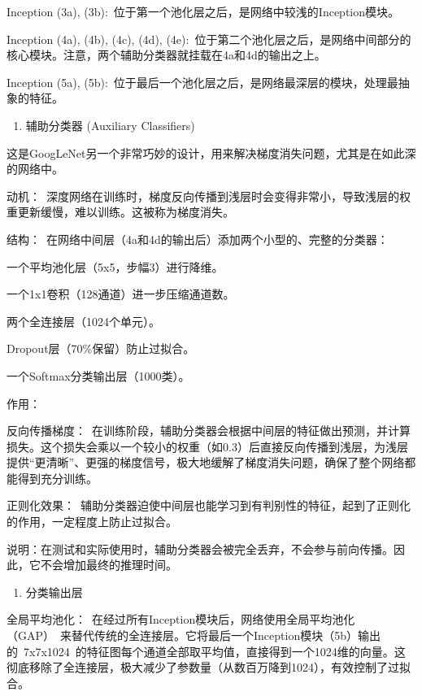 Inception (3a), (3b):~位于第一个池化层之后，是网络中较浅的Inception模块。

Inception (4a), (4b), (4c), (4d), (4e):~位于第二个池化层之后，是网络中间部分的核心模块。注意，两个辅助分类器就挂载在4a和4d的输出之上。

Inception (5a), (5b):~位于最后一个池化层之后，是网络最深层的模块，处理最抽象的特征。

\begin{enumerate}
\def\labelenumi{\arabic{enumi}.}
\setcounter{enumi}{2}
\tightlist
\item
  辅助分类器 (Auxiliary Classifiers)
\end{enumerate}

这是GoogLeNet另一个非常巧妙的设计，用来解决梯度消失问题，尤其是在如此深的网络中。

动机：~深度网络在训练时，梯度反向传播到浅层时会变得非常小，导致浅层的权重更新缓慢，难以训练。这被称为梯度消失。

结构：~在网络中间层（4a和4d的输出后）添加两个小型的、完整的分类器：

一个平均池化层（5x5，步幅3）进行降维。

一个1x1卷积（128通道）进一步压缩通道数。

两个全连接层（1024个单元）。

Dropout层（70\%保留）防止过拟合。

一个Softmax分类输出层（1000类）。

作用：

反向传播梯度：~在训练阶段，辅助分类器会根据中间层的特征做出预测，并计算损失。这个损失会乘以一个较小的权重（如0.3）后直接反向传播到浅层，为浅层提供``更清晰''、更强的梯度信号，极大地缓解了梯度消失问题，确保了整个网络都能得到充分训练。

正则化效果：~辅助分类器迫使中间层也能学习到有判别性的特征，起到了正则化的作用，一定程度上防止过拟合。

说明：在测试和实际使用时，辅助分类器会被完全丢弃，不会参与前向传播。因此，它不会增加最终的推理时间。

\begin{enumerate}
\def\labelenumi{\arabic{enumi}.}
\setcounter{enumi}{3}
\tightlist
\item
  分类输出层
\end{enumerate}

全局平均池化：~在经过所有Inception模块后，网络使用全局平均池化（GAP）~来替代传统的全连接层。它将最后一个Inception模块（5b）输出的~7x7x1024~的特征图每个通道全部取平均值，直接得到一个1024维的向量。这彻底移除了全连接层，极大减少了参数量（从数百万降到1024），有效控制了过拟合。


